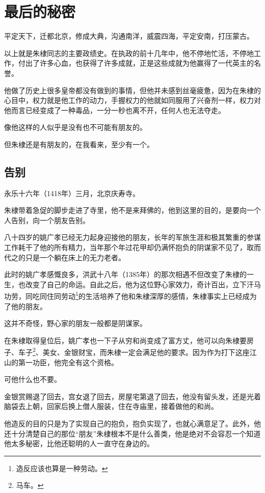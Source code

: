 \section{最后的秘密}
\ifnum{}
	\begin{multicols}{\theparacolNo}
\fi
平定天下，迁都北京，修成大典，沟通南洋，威震四海，平定安南，打压蒙古。

以上就是朱棣同志的主要政绩史。在执政的前十几年中，他不停地忙活，不停地工作，付出了许多心血，也获得了许多成就，正是这些成就为他赢得了一代英主的名誉。

他做了历史上很多皇帝都没有做到的事情，但他并未感到丝毫疲惫，因为在朱棣的心目中，权力就是他工作的动力，手握权力的他就如同服用了兴奋剂一样，权力对他而言已经变成了一种毒品，一分一秒也离不开，任何人也无法夺走。

像他这样的人似乎是没有也不可能有朋友的。

但朱棣还是有朋友的，在我看来，至少有一个。

\subsection{告别}
永乐十六年（1418年）三月，北京庆寿寺。

朱棣带着急促的脚步走进了寺里，他不是来拜佛的，他到这里的目的，是要向一个人告别，向一个朋友告别。

八十四岁的姚广孝已经无力起身迎接他的朋友，长年的军旅生涯和极其繁重的参谋工作耗干了他的所有精力，当年那个年过花甲却仍满怀抱负的阴谋家不见了，取而代之的只是一个躺在床上的无力老者。

此时的姚广孝感慨良多，洪武十八年（1385年）的那次相遇不但改变了朱棣的一生，也改变了自己的命运。自此之后，他为这位野心家效力，奇计百出，立下汗马功劳，同吃同住同劳动\footnote{造反应该也算是一种劳动。}的生活培养了他和朱棣深厚的感情，朱棣事实上已经成为了他的朋友。

这并不奇怪，野心家的朋友一般都是阴谋家。

在朱棣取得皇位后，姚广孝也一下子从穷和尚变成了富方丈，他可以向朱棣要房子、车子\footnote{马车。}、美女、金银财宝，而朱棣一定会满足他的要求。因为作为打下这座江山的第一功臣，他完全有这个资格。

可他什么也不要。

金银赏赐退了回去，宫女退了回去，房屋宅第退了回去，他没有留头发，还是光着脑袋去上朝，回家后换上僧人服装，住在寺庙里，接着做他的和尚。

他造反的目的只是为了实现自己的抱负，抱负实现了，也就心满意足了。此外，他还十分清楚自己的那位“朋友”朱棣根本不是什么善类，他是绝对不会容忍一个知道他太多秘密，比他还聪明的人一直守在身边的。


\end{multicols}
